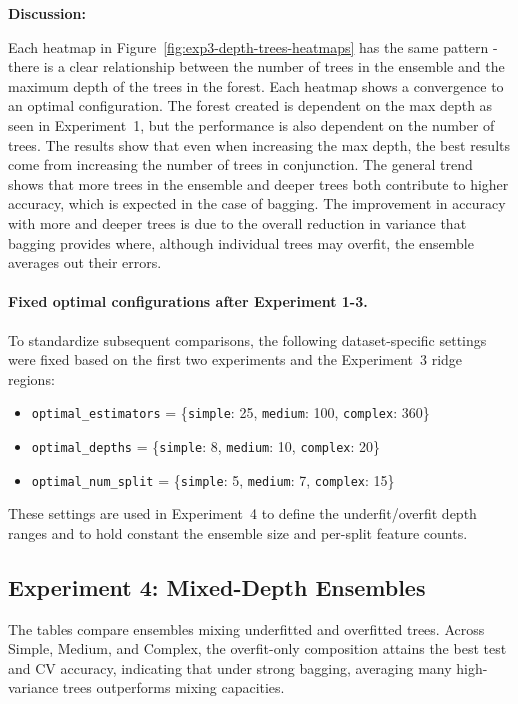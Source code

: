 \documentclass[conference]{IEEEtran}
\begin{document}
\textbf{Discussion:}

  Each heatmap in Figure~\ref{fig:exp3-depth-trees-heatmaps} has the same pattern - there is a clear relationship between the number of trees in the ensemble and the maximum depth of the trees in the forest. Each heatmap shows a convergence to an optimal configuration. The forest created is dependent on the max depth as seen in Experiment~1, but the performance is also dependent on the number of trees. The results show that even when increasing the max depth, the best results come from increasing the number of trees in conjunction. The general trend shows that more trees in the ensemble and deeper trees both contribute to higher accuracy, which is expected in the case of bagging. The improvement in accuracy with more and deeper trees is due to the overall reduction in variance that bagging provides where, although individual trees may overfit, the ensemble averages out their errors.  

\paragraph{Fixed optimal configurations after Experiment 1-3.} To standardize subsequent comparisons, the following dataset-specific settings were fixed based on the first two experiments and the Experiment~3 ridge regions:
\begin{itemize}
  \item \texttt{optimal\_estimators} = \{\texttt{simple}: 25, \texttt{medium}: 100, \texttt{complex}: 360\}
  \item \texttt{optimal\_depths} = \{\texttt{simple}: 8, \texttt{medium}: 10, \texttt{complex}: 20\}
  \item \texttt{optimal\_num\_split} = \{\texttt{simple}: 5, \texttt{medium}: 7, \texttt{complex}: 15\}
\end{itemize}
These settings are used in Experiment~4 to define the underfit/overfit depth ranges and to hold constant the ensemble size and per-split feature counts.

\subsection{Experiment 4: Mixed-Depth Ensembles}
\label{sec:results-exp4}
The tables compare ensembles mixing underfitted and overfitted trees. Across Simple, Medium, and Complex, the overfit-only composition attains the best test and CV accuracy, indicating that under strong bagging, averaging many high-variance trees outperforms mixing capacities. 
\end{document}
